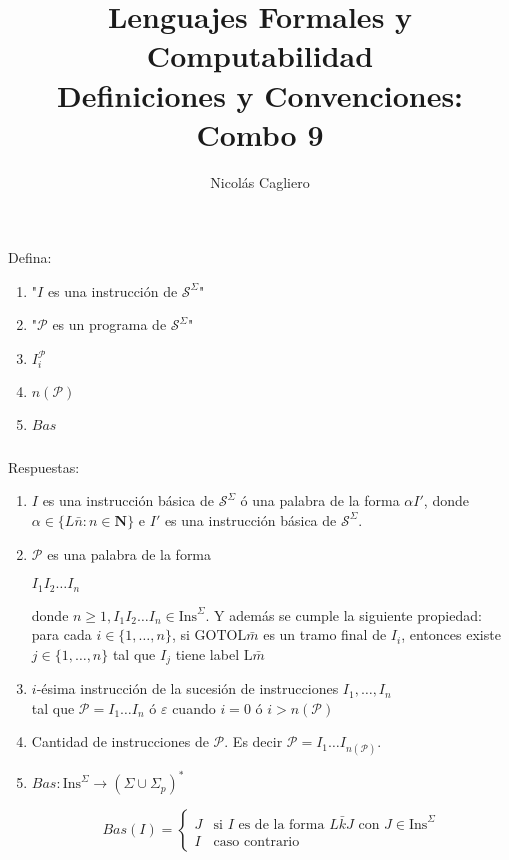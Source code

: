 \documentclass{article}
\title{Lenguajes Formales y Computabilidad \\
        \large Definiciones y Convenciones: Combo 9 }
\author{Nicolás Cagliero}
\begin{document}
\maketitle

Defina:

\begin{enumerate}
    \item "$I$ es una instrucción de $\mathcal{S}^{\Sigma}$"
    
    \item "$\mathcal{P}$ es un programa de $\mathcal{S}^{\Sigma}$"
    
    \item $I_i^{\mathcal{P}}$
    
    \item $n(\mathcal{P})$
    
    \item $Bas$
\end{enumerate}

\(\)
\begin{center}
    Respuestas: 
    \(\)
\end{center}

\begin{enumerate}
    \item $I$ es una instrucción básica de $\mathcal{S}^{\Sigma}$ 
    ó una palabra de la forma $\alpha I'$, donde $\alpha \in
    \{L \bar{n} : n \in \mathbf{N} \}$ e $I'$ es una instrucción
    básica de $\mathcal{S}^{\Sigma}$.

    \item $\mathcal{P}$ es una palabra de la forma
    \begin{center}
        $I_1 I_2 \dots I_n$
    \end{center}
    donde $n \geq 1, I_1 I_2 \dots I_n \in \text{Ins}^{\Sigma}$. Y además
    se cumple la siguiente propiedad: para cada $i \in \{1, \dots, n\}$,
    si $\text{GOTOL}\bar{m}$ es un tramo final de $I_i$, entonces
    existe $j \in \{1, \dots, n\}$ tal que $I_j$ tiene label
    $\text{L}\bar{m}$

    \item $i$-ésima instrucción de la sucesión de instrucciones 
    $I_1, \dots, I_n$ \\tal que $\mathcal{P} = I_1 \dots I_n$ ó $\varepsilon$
    cuando $i = 0$ ó $i > n(\mathcal{P})$

    \item Cantidad de instrucciones de $\mathcal{P}$. Es decir 
    $\mathcal{P} = I_1 \dots I_{n(\mathcal{P})}$.

    \item $Bas : \text{Ins}^{\Sigma} \rightarrow (\Sigma \cup \Sigma_p)^{*}$
    \begin{center}
        
    \[
        Bas(I) =
        \begin{cases}
        J & \text{si } I \text{ es de la forma } L\bar{k}J \text{ con } J \in \text{Ins}^\Sigma \\
        I & \text{caso contrario}
        \end{cases}
    \]
    \end{center}
\end{enumerate}
\end{document}
